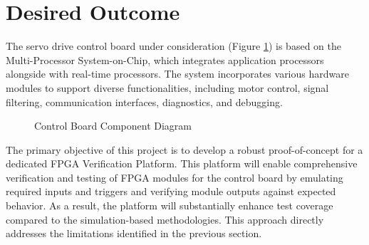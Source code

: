 \section{Desired Outcome}
\label{sec:intro:DesiredOutcome}

The servo drive control board under consideration (Figure \ref{fig:intro:simplified_servo_drive_control_board}) is based on the Multi-Processor System-on-Chip, which integrates application processors alongside with real-time processors. The system incorporates various hardware modules to support diverse functionalities, including motor control, signal filtering, communication interfaces, diagnostics, and debugging.

\begin{figure}[htbp]
	\centering
	\caption{Control Board Component Diagram}
	\label{fig:intro:simplified_servo_drive_control_board}
\end{figure}


The primary objective of this project is to develop a robust proof-of-concept for a dedicated \acs{FPGA} Verification Platform. This platform will enable comprehensive verification and testing of \acs{FPGA} modules for the control board by emulating required inputs and triggers and verifying module outputs against expected behavior. As a result, the platform will substantially enhance test coverage compared to the simulation-based methodologies. This approach directly addresses the limitations identified in the previous section.

